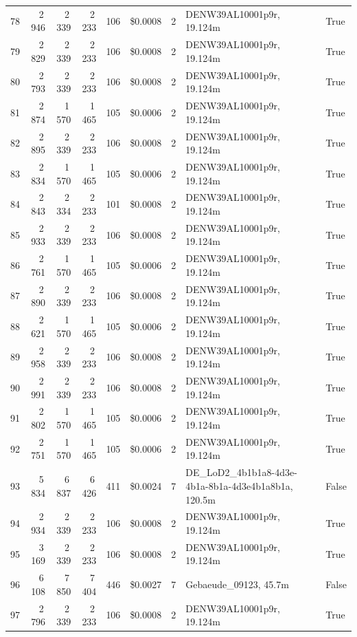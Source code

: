 \documentclass[a4paper,11pt]{article}
\begin{document}
\begin{table}[ht]
\begin{tabular}{r r r r r r r p{3cm} l}
78 & 2\,946 & 2\,339 & 2\,233 & 106 & \$0.0008 & 2 & DENW39AL10001p9r, 19.124m & True \\
79 & 2\,829 & 2\,339 & 2\,233 & 106 & \$0.0008 & 2 & DENW39AL10001p9r, 19.124m & True \\
80 & 2\,793 & 2\,339 & 2\,233 & 106 & \$0.0008 & 2 & DENW39AL10001p9r, 19.124m & True \\
81 & 2\,874 & 1\,570 & 1\,465 & 105 & \$0.0006 & 2 & DENW39AL10001p9r, 19.124m & True \\
82 & 2\,895 & 2\,339 & 2\,233 & 106 & \$0.0008 & 2 & DENW39AL10001p9r, 19.124m & True \\
83 & 2\,834 & 1\,570 & 1\,465 & 105 & \$0.0006 & 2 & DENW39AL10001p9r, 19.124m & True \\
84 & 2\,843 & 2\,334 & 2\,233 & 101 & \$0.0008 & 2 & DENW39AL10001p9r, 19.124m & True \\
85 & 2\,933 & 2\,339 & 2\,233 & 106 & \$0.0008 & 2 & DENW39AL10001p9r, 19.124m & True \\
86 & 2\,761 & 1\,570 & 1\,465 & 105 & \$0.0006 & 2 & DENW39AL10001p9r, 19.124m & True \\
87 & 2\,890 & 2\,339 & 2\,233 & 106 & \$0.0008 & 2 & DENW39AL10001p9r, 19.124m & True \\
88 & 2\,621 & 1\,570 & 1\,465 & 105 & \$0.0006 & 2 & DENW39AL10001p9r, 19.124m & True \\
89 & 2\,958 & 2\,339 & 2\,233 & 106 & \$0.0008 & 2 & DENW39AL10001p9r, 19.124m & True \\
90 & 2\,991 & 2\,339 & 2\,233 & 106 & \$0.0008 & 2 & DENW39AL10001p9r, 19.124m & True \\
91 & 2\,802 & 1\,570 & 1\,465 & 105 & \$0.0006 & 2 & DENW39AL10001p9r, 19.124m & True \\
92 & 2\,751 & 1\,570 & 1\,465 & 105 & \$0.0006 & 2 & DENW39AL10001p9r, 19.124m & True \\
93 & 5\,834 & 6\,837 & 6\,426 & 411 & \$0.0024 & 7 & DE\_LoD2\_4b1b1a8-4d3e-4b1a-8b1a-4d3e4b1a8b1a, 120.5m & False \\
94 & 2\,934 & 2\,339 & 2\,233 & 106 & \$0.0008 & 2 & DENW39AL10001p9r, 19.124m & True \\
95 & 3\,169 & 2\,339 & 2\,233 & 106 & \$0.0008 & 2 & DENW39AL10001p9r, 19.124m & True \\
96 & 6\,108 & 7\,850 & 7\,404 & 446 & \$0.0027 & 7 & Gebaeude\_09123, 45.7m & False \\
97 & 2\,796 & 2\,339 & 2\,233 & 106 & \$0.0008 & 2 & DENW39AL10001p9r, 19.124m & True \\

\end{tabular}
\end{table}
\end{document}
